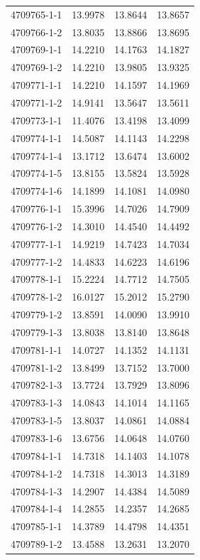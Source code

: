 \begin{longtable}{lrrr}
4709765-1-1 & 13.9978 & 13.8644 & 13.8657 \\
4709766-1-2 & 13.8035 & 13.8866 & 13.8695 \\
4709769-1-1 & 14.2210 & 14.1763 & 14.1827 \\
4709769-1-2 & 14.2210 & 13.9805 & 13.9325 \\
4709771-1-1 & 14.2210 & 14.1597 & 14.1969 \\
4709771-1-2 & 14.9141 & 13.5647 & 13.5611 \\
4709773-1-1 & 11.4076 & 13.4198 & 13.4099 \\
4709774-1-1 & 14.5087 & 14.1143 & 14.2298 \\
4709774-1-4 & 13.1712 & 13.6474 & 13.6002 \\
4709774-1-5 & 13.8155 & 13.5824 & 13.5928 \\
4709774-1-6 & 14.1899 & 14.1081 & 14.0980 \\
4709776-1-1 & 15.3996 & 14.7026 & 14.7909 \\
4709776-1-2 & 14.3010 & 14.4540 & 14.4492 \\
4709777-1-1 & 14.9219 & 14.7423 & 14.7034 \\
4709777-1-2 & 14.4833 & 14.6223 & 14.6196 \\
4709778-1-1 & 15.2224 & 14.7712 & 14.7505 \\
4709778-1-2 & 16.0127 & 15.2012 & 15.2790 \\
4709779-1-2 & 13.8591 & 14.0090 & 13.9910 \\
4709779-1-3 & 13.8038 & 13.8140 & 13.8648 \\
4709781-1-1 & 14.0727 & 14.1352 & 14.1131 \\
4709781-1-2 & 13.8499 & 13.7152 & 13.7000 \\
4709782-1-3 & 13.7724 & 13.7929 & 13.8096 \\
4709783-1-3 & 14.0843 & 14.1014 & 14.1165 \\
4709783-1-5 & 13.8037 & 14.0861 & 14.0884 \\
4709783-1-6 & 13.6756 & 14.0648 & 14.0760 \\
4709784-1-1 & 14.7318 & 14.1403 & 14.1078 \\
4709784-1-2 & 14.7318 & 14.3013 & 14.3189 \\
4709784-1-3 & 14.2907 & 14.4384 & 14.5089 \\
4709784-1-4 & 14.2855 & 14.2357 & 14.2685 \\
4709785-1-1 & 14.3789 & 14.4798 & 14.4351 \\
4709789-1-2 & 13.4588 & 13.2631 & 13.2070 \\

\end{longtable}
